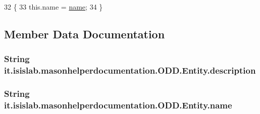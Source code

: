 \begin{DoxyCode}
32                                      \{
33         this.name = \hyperlink{classit_1_1isislab_1_1masonhelperdocumentation_1_1_o_d_d_1_1_entity_aa635443223d2902214dfb197aa7e17f0}{name};
34     \}
\end{DoxyCode}


\subsection{Member Data Documentation}
\hypertarget{classit_1_1isislab_1_1masonhelperdocumentation_1_1_o_d_d_1_1_entity_a28e55723c0334f36c4296ff8b891daa9}{
\subsubsection[{description}]{\setlength{\rightskip}{0pt plus 5cm}String it.\-isislab.\-masonhelperdocumentation.\-O\-D\-D.\-Entity.\-description\hspace{0.3cm}{\ttfamily [private]}}}\label{classit_1_1isislab_1_1masonhelperdocumentation_1_1_o_d_d_1_1_entity_a28e55723c0334f36c4296ff8b891daa9}
\hypertarget{classit_1_1isislab_1_1masonhelperdocumentation_1_1_o_d_d_1_1_entity_aa635443223d2902214dfb197aa7e17f0}{
\subsubsection[{name}]{\setlength{\rightskip}{0pt plus 5cm}String it.\-isislab.\-masonhelperdocumentation.\-O\-D\-D.\-Entity.\-name\hspace{0.3cm}{\ttfamily [private]}}}\label{classit_1_1isislab_1_1masonhelperdocumentation_1_1_o_d_d_1_1_entity_aa635443223d2902214dfb197aa7e17f0}

